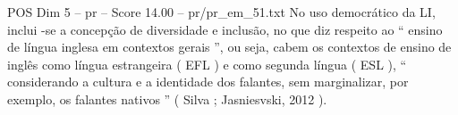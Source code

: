 \begin{textsample}{POS Dim 5 – pr – Score 14.00 – pr/pr\_em\_51.txt}
No uso democrático da LI, inclui -se a concepção de diversidade e inclusão, no que diz respeito ao “ ensino de língua inglesa em contextos gerais ”, ou seja, cabem os contextos de ensino de inglês como língua estrangeira ( EFL ) e como segunda língua ( ESL ), “ considerando a cultura e a identidade dos falantes, sem marginalizar, por exemplo, os falantes nativos ” ( Silva ; Jasniesvski, 2012 ).

\end{textsample}
